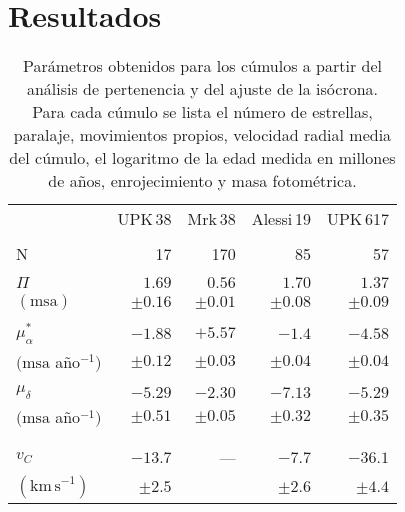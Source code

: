 \documentclass[baaa]{baaa}
\begin{document}
\section{Resultados}
\begin{table}[!t]
\centering
\caption{Parámetros obtenidos para los cúmulos a partir del análisis de pertenencia y del ajuste de la isócrona. Para cada cúmulo se lista el número de estrellas, paralaje, movimientos propios, velocidad radial media del cúmulo, el logaritmo de la edad medida en millones de años, enrojecimiento y masa fotométrica.}
\begin{tabular}{lrrrr}
\hline\hline\noalign{\smallskip}
                                 &  UPK\,38       & Mrk\,38     & Alessi\,19      &  UPK\,617  \\
 \\
\hline\noalign{\smallskip}
N                                &  17            &  170       & 85            & 57      \\
                                 &                &            &               &         \\
$\varPi$                         &  $1.69$        &  $0.56$    & $1.70$        & $1.37$ \\
$(\mathrm{msa})$                 &  $\pm0.16$     &  $\pm0.01$ & $\pm0.08$     & $\pm0.09$\\
                                 &                &            &               &   \\
$\mu_\alpha^*$                   &  $-1.88$       & $+5.57$    & $-1.4$       & $-4.58$ \\
$(\mathrm{msa}$ año$^{-1})$      &  $\pm0.12$     & $\pm 0.03$ & $\pm 0.04$    & $\pm 0.04$ \\
                                 &                &            &               &   \\
$\mu_\delta$                     &  $-5.29$       & $-2.30$    & $ -7.13$      & $-5.29$ \\
$(\mathrm{msa}$ año$^{-1})$      &  $\pm 0.51$    &  $\pm0.05$ & $\pm 0.32$    & $\pm 0.35$ \\
                                 &                &            &               &   \\
                                 &                &            &               &   \\
  $v_C$                          &  $-13.7  $    &  ---       & $-7.7$       & $-36.1$\\
$(\mathrm{km\,s}^{-1})$          &  $\pm2.5 $    &            & $\pm2.6 $    & $\pm4.4 $\\

\end{tabular}
\end{table}
\end{document}
